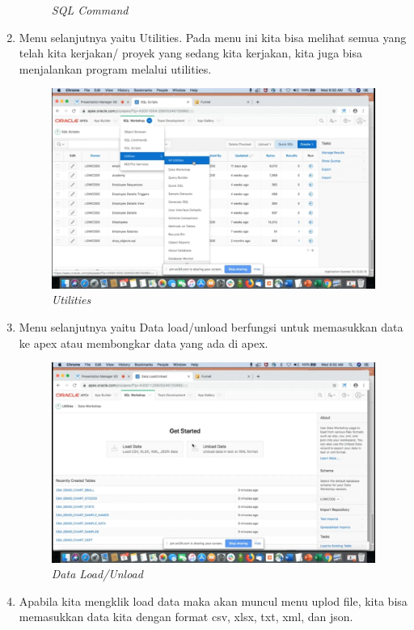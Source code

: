 \begin{enumerate}
\begin{figure}[H]
    \caption{\textit{SQL Command}}
    \label{foto13}
\end{figure}
\item Menu selanjutnya yaitu Utilities. Pada menu ini kita bisa melihat semua yang telah kita kerjakan/ proyek yang sedang kita kerjakan, kita juga bisa menjalankan program melalui utilities.
 \begin{figure}[H]
    \centering
    \includegraphics[scale=0.5]{figures/o}
    \caption{\textit{Utilities}}
    \label{foto15}
\end{figure}
\item Menu selanjutnya yaitu Data load/unload berfungsi untuk memasukkan data ke apex atau membongkar data yang ada di apex.
 \begin{figure}[H]
    \centering
    \includegraphics[scale=0.5]{figures/p}
    \caption{\textit{Data Load/Unload}}
    \label{foto16}
\end{figure}
\item Apabila kita mengklik load data maka akan muncul menu uplod file, kita bisa memasukkan data kita dengan format csv, xlsx, txt, xml, dan json.

\end{enumerate}
